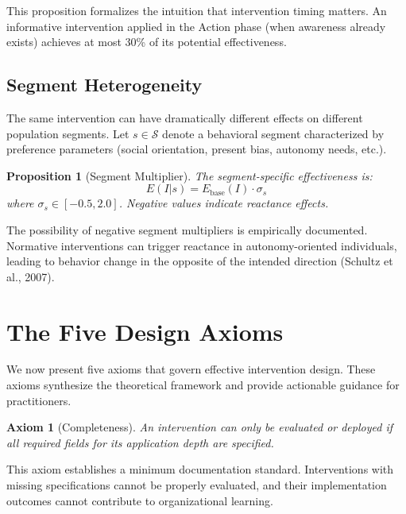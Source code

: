 \documentclass[12pt,a4paper]{article}
\newtheorem{proposition}{Proposition}
\newtheorem{axiom}{Axiom}
\begin{document}
This proposition formalizes the intuition that intervention timing matters. An informative intervention applied in the Action phase (when awareness already exists) achieves at most 30\% of its potential effectiveness.

\subsection{Segment Heterogeneity}

The same intervention can have dramatically different effects on different population segments. Let $s \in \mathcal{S}$ denote a behavioral segment characterized by preference parameters (social orientation, present bias, autonomy needs, etc.).

\begin{proposition}[Segment Multiplier]
The segment-specific effectiveness is:
\begin{equation}
E(I | s) = E_{\text{base}}(I) \cdot \sigma_s
\end{equation}
where $\sigma_s \in [-0.5, 2.0]$. Negative values indicate reactance effects.
\end{proposition}

The possibility of negative segment multipliers is empirically documented. Normative interventions can trigger reactance in autonomy-oriented individuals, leading to behavior change in the opposite of the intended direction (Schultz et al., 2007).


\section{The Five Design Axioms}

We now present five axioms that govern effective intervention design. These axioms synthesize the theoretical framework and provide actionable guidance for practitioners.

\begin{axiom}[Completeness]
An intervention can only be evaluated or deployed if all required fields for its application depth are specified.
\end{axiom}

This axiom establishes a minimum documentation standard. Interventions with missing specifications cannot be properly evaluated, and their implementation outcomes cannot contribute to organizational learning.
\end{document}
